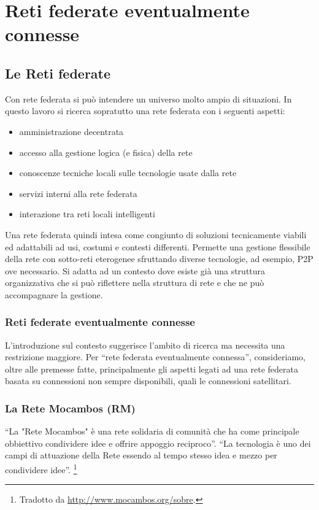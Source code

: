 
\chapter{Reti federate eventualmente connesse}
\label{Capitolo2}

\section{Le Reti federate}
Con rete federata si può intendere un universo molto ampio di
situazioni. In questo lavoro si ricerca sopratutto una rete federata
con i seguenti aspetti:
\begin{itemize}
  \item amministrazione decentrata 
  \item accesso alla gestione logica (e fisica) della rete
  \item conoscenze tecniche locali sulle tecnologie usate dalla rete
  \item servizi interni alla rete federata
  \item interazione tra reti locali intelligenti
\end{itemize} 

Una rete federata quindi intesa come congiunto di soluzioni
tecnicamente viabili ed adattabili ad usi, costumi e contesti
differenti. Permette una gestione flessibile della rete con sotto-reti
eterogenee sfruttando diverse tecnologie, ad esempio, P2P ove
necessario. Si adatta ad un contesto dove esiste già una struttura
organizzativa che si può riflettere nella struttura di rete e che ne
può accompagnare la gestione.

\subsection{Reti federate eventualmente connesse}
L'introduzione sul contesto suggerisce l'ambito di ricerca ma
necessita una restrizione maggiore. Per ``rete
federata eventualmente connessa'', consideriamo, oltre alle premesse
fatte, principalmente gli aspetti legati ad una rete federata basata
su connessioni non sempre disponibili, quali le connessioni
satellitari.

\subsection{La Rete Mocambos (RM)}
\label{sec:ReteMocambos}
``La "Rete Mocambos" è una rete solidaria di comunità che ha come
principale obbiettivo condividere idee e offrire appoggio reciproco''.
``La tecnologia è uno dei campi di attuazione della Rete essendo al
tempo stesso idea e mezzo per condividere idee''. \footnote{Tradotto da
  \url{http://www.mocambos.org/sobre}.}

